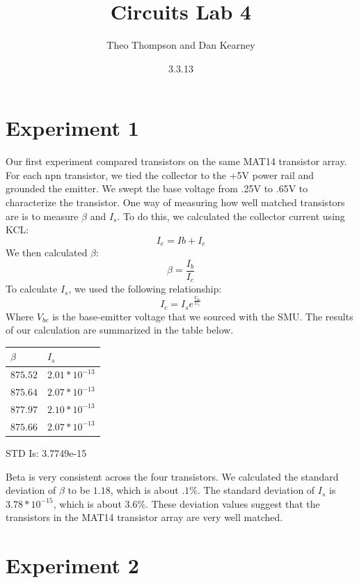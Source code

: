 \documentclass{article}
\title{Circuits Lab 4}
\author{Theo Thompson and Dan Kearney}
\date{3.3.13}
\begin{document}
\maketitle

\section*{Experiment 1}

Our first experiment compared transistors on the same MAT14 transistor array. For each npn transistor, we tied the collector to the +5V power rail and grounded the emitter. We swept the base voltage from .25V to .65V to characterize the transistor. One way of measuring how well matched transistors are is to measure $\beta$ and $I_{s}$. To do this, we calculated the collector current using KCL: \[I_{e}=I{b}+I_{c}\]
We then calculated $\beta$:\[\beta=\frac{I_{b}}{I_{c}}\]
To calculate $I_{s}$, we used the following relationship: \[I_{c}=I_{s}e^{\frac{V_{be}}{U_{t}}}\]
Where $V_{be}$ is the base-emitter voltage that we sourced with the SMU. The results of our calculation are summarized in the table below.
\begin{center}
    \begin{tabular}{| l | l |} \hline
    $\beta$ & $I_{s}$ \\ \hline \hline
    $875.52$ & $2.01*10^{-13}$ \\ \hline
    $875.64$ & $2.07*10^{-13}$\\ \hline
    $877.97$ & $2.10*10^{-13}$ \\ \hline
    $875.66$ & $2.07*10^{-13}$ \\ \hline
    \end{tabular}
    STD Is: 3.7749e-15
\end{center}

Beta is very consistent across the four transistors. We calculated the standard deviation of $\beta$ to be $1.18$, which is about $.1\%$. The standard deviation of $I_{s}$ is $3.78*10^{-15}$, which is about $3.6\%$. These deviation values suggest that the transistors in the MAT14 transistor array are very well matched.

\begin{figure}[h!]
\begin{center}
\caption{}
\label{fig:exp1a}
\end{center}
\end{figure}

\section*{Experiment 2}
\end{document}
